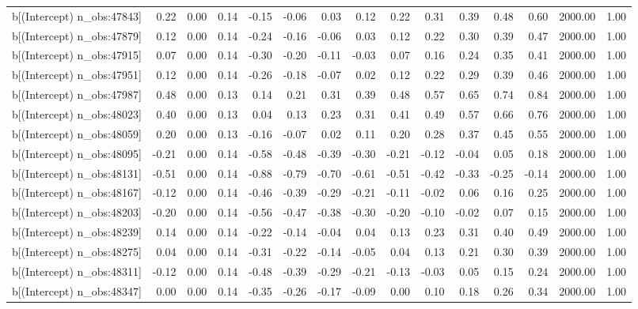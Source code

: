 \begin{table}[ht]
\begin{tabular}{rrrrrrrrrrrrrrr}
  b[(Intercept) n\_obs:47843] & 0.22 & 0.00 & 0.14 & -0.15 & -0.06 & 0.03 & 0.12 & 0.22 & 0.31 & 0.39 & 0.48 & 0.60 & 2000.00 & 1.00 \\ 
  b[(Intercept) n\_obs:47879] & 0.12 & 0.00 & 0.14 & -0.24 & -0.16 & -0.06 & 0.03 & 0.12 & 0.22 & 0.30 & 0.39 & 0.47 & 2000.00 & 1.00 \\ 
  b[(Intercept) n\_obs:47915] & 0.07 & 0.00 & 0.14 & -0.30 & -0.20 & -0.11 & -0.03 & 0.07 & 0.16 & 0.24 & 0.35 & 0.41 & 2000.00 & 1.00 \\ 
  b[(Intercept) n\_obs:47951] & 0.12 & 0.00 & 0.14 & -0.26 & -0.18 & -0.07 & 0.02 & 0.12 & 0.22 & 0.29 & 0.39 & 0.46 & 2000.00 & 1.00 \\ 
  b[(Intercept) n\_obs:47987] & 0.48 & 0.00 & 0.13 & 0.14 & 0.21 & 0.31 & 0.39 & 0.48 & 0.57 & 0.65 & 0.74 & 0.84 & 2000.00 & 1.00 \\ 
  b[(Intercept) n\_obs:48023] & 0.40 & 0.00 & 0.13 & 0.04 & 0.13 & 0.23 & 0.31 & 0.41 & 0.49 & 0.57 & 0.66 & 0.76 & 2000.00 & 1.00 \\ 
  b[(Intercept) n\_obs:48059] & 0.20 & 0.00 & 0.13 & -0.16 & -0.07 & 0.02 & 0.11 & 0.20 & 0.28 & 0.37 & 0.45 & 0.55 & 2000.00 & 1.00 \\ 
  b[(Intercept) n\_obs:48095] & -0.21 & 0.00 & 0.14 & -0.58 & -0.48 & -0.39 & -0.30 & -0.21 & -0.12 & -0.04 & 0.05 & 0.18 & 2000.00 & 1.00 \\ 
  b[(Intercept) n\_obs:48131] & -0.51 & 0.00 & 0.14 & -0.88 & -0.79 & -0.70 & -0.61 & -0.51 & -0.42 & -0.33 & -0.25 & -0.14 & 2000.00 & 1.00 \\ 
  b[(Intercept) n\_obs:48167] & -0.12 & 0.00 & 0.14 & -0.46 & -0.39 & -0.29 & -0.21 & -0.11 & -0.02 & 0.06 & 0.16 & 0.25 & 2000.00 & 1.00 \\ 
  b[(Intercept) n\_obs:48203] & -0.20 & 0.00 & 0.14 & -0.56 & -0.47 & -0.38 & -0.30 & -0.20 & -0.10 & -0.02 & 0.07 & 0.15 & 2000.00 & 1.00 \\ 
  b[(Intercept) n\_obs:48239] & 0.14 & 0.00 & 0.14 & -0.22 & -0.14 & -0.04 & 0.04 & 0.13 & 0.23 & 0.31 & 0.40 & 0.49 & 2000.00 & 1.00 \\ 
  b[(Intercept) n\_obs:48275] & 0.04 & 0.00 & 0.14 & -0.31 & -0.22 & -0.14 & -0.05 & 0.04 & 0.13 & 0.21 & 0.30 & 0.39 & 2000.00 & 1.00 \\ 
  b[(Intercept) n\_obs:48311] & -0.12 & 0.00 & 0.14 & -0.48 & -0.39 & -0.29 & -0.21 & -0.13 & -0.03 & 0.05 & 0.15 & 0.24 & 2000.00 & 1.00 \\ 
  b[(Intercept) n\_obs:48347] & 0.00 & 0.00 & 0.14 & -0.35 & -0.26 & -0.17 & -0.09 & 0.00 & 0.10 & 0.18 & 0.26 & 0.34 & 2000.00 & 1.00 \\ 

\end{tabular}
\end{table}
